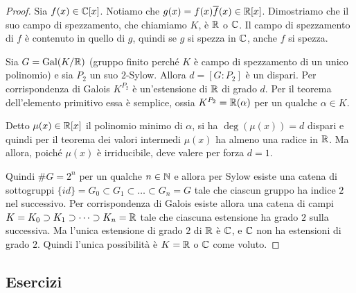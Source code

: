 \begin{proof}
    Sia $f(x) \in \mathbb{C}[x]$. Notiamo che $g(x) = f(x) \overline{f}(x) \in \mathbb{R}[x]$. Dimostriamo che il suo campo di spezzamento, che chiamiamo $K$, è $\mathbb{R}$ o $\mathbb{C}$.
    Il campo di spezzamento di $f$ è contenuto in quello di $g$, quindi se $g$ si spezza in $\mathbb{C}$, anche $f$ si spezza.

    \begin{minipage}{0.2\textwidth}  
    \end{minipage}\hfill
    \begin{minipage}{0.75\textwidth}  
    Sia $G = \text{Gal}(K/\mathbb{R})$ (gruppo finito perché $K$ è campo di spezzamento di un unico polinomio) e sia $P_2$ un suo $2$-Sylow. Allora $d = [G : P_2]$ è un dispari. Per corrispondenza di Galois $K^{P_2}$ è un'estensione di $\mathbb{R}$ di grado $d$. Per il teorema dell'elemento primitivo essa è semplice, ossia $K^{P_2}=\mathbb{R}(\alpha)$ per un qualche $\alpha \in K$. 
    \end{minipage}\hfill 
    
    Detto $\mu(x)\in \mathbb{R}[x]$ il polinomio minimo di $\alpha$, si ha $\deg(\mu(x)) = d$ dispari e quindi per il teorema dei valori intermedi $\mu(x)$ ha almeno una radice in $\mathbb{R}$. Ma allora, poiché $\mu(x)$ è irriducibile, deve valere per forza $d=1$.
    
    Quindi $\#G = 2^n$ per un qualche $n \in \mathbb{N}$ e allora per Sylow esiste una catena di sottogruppi $\{id\}=G_0 \subset G_1 \subset \dots \subset G_n = G$ tale che ciascun gruppo ha indice $2$ nel successivo. Per corrispondenza di Galois esiste allora una catena di campi $K=K_0 \supset K_1 \supset \dots \supset K_n = \mathbb{R}$ tale che ciascuna estensione ha grado $2$ sulla successiva. Ma l'unica estensione di grado $2$ di $\mathbb{R}$ è $\mathbb{C}$, e $\mathbb{C}$ non ha estensioni di grado $2$. Quindi l'unica possibilità è $K = \mathbb{R}$ o $\mathbb{C}$ come voluto.
\end{proof}

\subsection{Esercizi}

